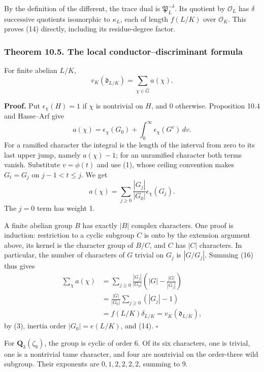 \documentclass[11pt,a4paper]{article}
\begin{document}
By the definition of the different, the trace dual is
\(\mathfrak P_L^{-\delta}\). Its quotient by \(\mathcal O_L\) has
\(\delta\) successive quotients isomorphic to \(\kappa_L\), each of
length \(f(L/K)\) over \(\mathcal O_K\). This proves (14) directly,
including its residue-degree factor.

\subsubsection{Theorem 10.5. The local conductor--discriminant
formula}\label{theorem-10.5.-the-local-conductordiscriminant-formula}

For finite abelian \(L/K\), \[
v_K(\mathfrak d_{L/K})=\sum_{\chi\in\widehat G}a(\chi).
\tag{15}
\]

\textbf{Proof.} Put \(\epsilon_\chi(H)=1\) if \(\chi\) is nontrivial on
\(H\), and 0 otherwise. Proposition 10.4 and Hasse--Arf give \[
a(\chi)=\epsilon_\chi(G_0)
           +\int_0^\infty\epsilon_\chi(G^v)\,dv.
\] For a ramified character the integral is the length of the interval
from zero to its last upper jump, namely \(a(\chi)-1\); for an
unramified character both terms vanish. Substitute \(v=\phi(t)\) and use
(1), whose ceiling convention makes \(G_t=G_j\) on \(j-1<t\leq j\). We
get \[
a(\chi)=\sum_{j\geq0}
          \frac{|G_j|}{|G_0|}\epsilon_\chi(G_j).
\tag{16}
\] The \(j=0\) term has weight 1.

A finite abelian group \(B\) has exactly \(|B|\) complex characters. One
proof is induction: restriction to a cyclic subgroup \(C\) is onto by
the extension argument above, its kernel is the character group of
\(B/C\), and \(C\) has \(|C|\) characters. In particular, the number of
characters of \(G\) trivial on \(G_j\) is \(|G/G_j|\). Summing (16) thus
gives \[
\begin{aligned}
\sum_\chi a(\chi)
 &=\sum_{j\geq0}\frac{|G_j|}{|G_0|}
                \left(|G|-\frac{|G|}{|G_j|}\right)\\
 &=\frac{|G|}{|G_0|}\sum_{j\geq0}(|G_j|-1)\\
 &=f(L/K)\delta_{L/K}
 =v_K(\mathfrak d_{L/K}),
\end{aligned}
\] by (3), inertia order \(|G_0|=e(L/K)\), and (14). \(\square\)

For \(\mathbf Q_3(\zeta_9)\), the group is cyclic of order 6. Of its six
characters, one is trivial, one is a nontrivial tame character, and four
are nontrivial on the order-three wild subgroup. Their exponents are
\(0,1,2,2,2,2\), summing to 9.
\end{document}
